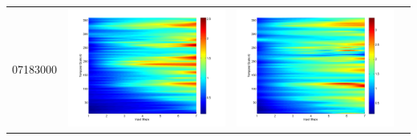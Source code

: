 \documentclass[11pt]{article}
\begin{document}
\begin{table}[H]
{\begin{tabular}{c  c   c   c  }
07183000&\begin{minipage}{.3\textwidth}\includegraphics[width=\linewidth]{resultgraph/07183000p.png}\end{minipage}
&\begin{minipage}{.3\textwidth}\includegraphics[width=\linewidth]{resultgraph/07183000pep.png}\end{minipage}

\end{tabular}}
\end{table}
\end{document}
